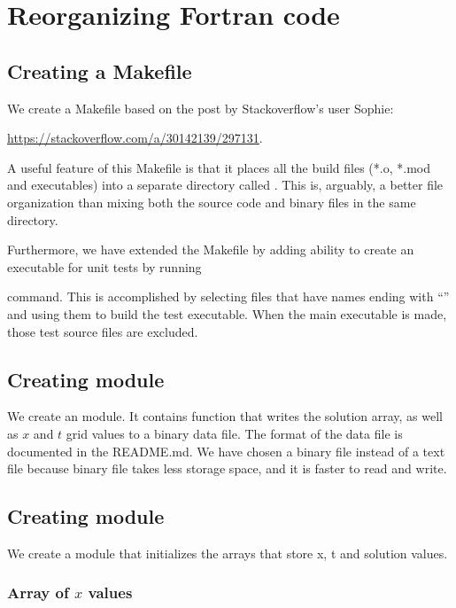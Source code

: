 \section{Reorganizing Fortran code}


\subsection{Creating a Makefile}

We create a Makefile based on the post by Stackoverflow's user Sophie:

\url{https://stackoverflow.com/a/30142139/297131}.

A useful feature of this Makefile is that it places all the build files (*.o, *.mod and executables) into a separate directory called . This is, arguably, a better file organization than mixing both the source code and binary  files in the same directory.

Furthermore, we have extended the Makefile by adding ability to create an executable for unit tests by running


command. This is accomplished by selecting files that have names ending with ``'' and using them to build the test executable. When the main executable is made, those test source files are excluded.


\subsection{Creating  module}

We create an  module. It contains  function that writes the solution array, as well as $x$ and $t$ grid values to a binary data file. The format of the data file is documented in the README.md. We have chosen a binary file instead of a text file because binary file takes less storage space, and it is faster to read and write.


\subsection{Creating  module}

We create a   module that initializes the arrays that store x, t and solution values.


\subsubsection*{Array of $x$ values}

